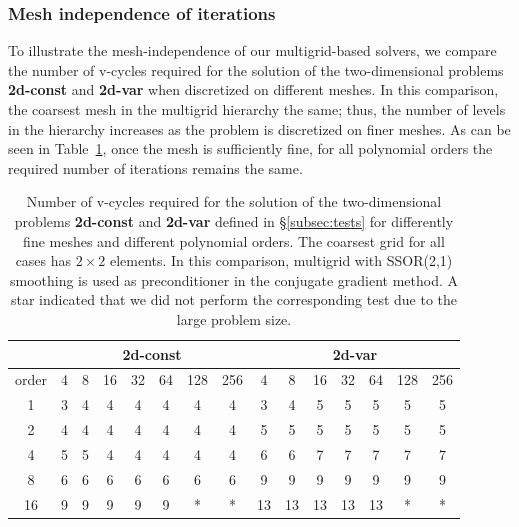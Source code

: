 \documentclass[smallcondensed,final]{svjour3}     %
\begin{document}
\subsubsection{Mesh independence of iterations}\label{subsec:num_mesh}
To illustrate the mesh-independence of our multigrid-based solvers, we
compare the number of v-cycles required for the solution of the
two-dimensional problems {\bf 2d-const} and {\bf 2d-var} when
discretized on different meshes. In this comparison, the coarsest mesh
in the multigrid hierarchy the same; thus, the number of levels in the
hierarchy increases as the problem is discretized on finer meshes. As
can be seen in Table~\ref{tab:meshInd}, once the mesh is sufficiently
fine, for all polynomial orders the required number of iterations
remains the same.
\begin{table}[h]\centering
\caption{\label{tab:meshInd} Number of v-cycles required for the
  solution of the two-dimensional problems {\bf 2d-const} and {\bf
    2d-var} defined in \S\ref{subsec:tests} for differently fine
  meshes and different polynomial orders. The coarsest grid for all
  cases has $2\times 2$ elements. In this comparison, multigrid with
  SSOR(2,1) smoothing is used as preconditioner in the conjugate
  gradient method. A star indicated that we did not perform the
  corresponding test due to the large problem size.}
\begin{tabular}{|c|c|c|c|c|c|c|c||c|c|c|c|c|c|c|}
	\hline
	 & \multicolumn{7}{c||}{\bf 2d-const} &
        \multicolumn{7}{c|}{\bf 2d-var} \\  
  \hline
	order & 4  &  8 & 16 & 32 & 64 & 128 & 256 & 4  &  8 & 16 & 32 & 64 & 128 & 256 \\
	\hline 
	 1    &  3 &  4 &  4 &  4 &  4 &  4  &  4  & 3  &  4 & 5  &  5 &  5 &  5  &  5  \\
	 2    &  4 &  4 &  4 &  4 &  4 &  4  &  4  & 5  &  5 & 5  &  5 &  5 &  5  &  5  \\
	 4    &  5 &  5 &  4 &  4 &  4 &  4  &  4  & 6  &  6 & 7  &  7 &  7 &  7  &  7  \\
	 8    &  6 &  6 &  6 &  6 &  6 &  6  &  6  & 9  &  9 & 9  &  9 &  9 &  9  &  9  \\
	 16   &  9 &  9 &  9 &  9 &  9 &  *  &  *  & 13 & 13 & 13 & 13 & 13 &  *  &  *  \\
	 \hline
\end{tabular}

\end{table}
\end{document}
